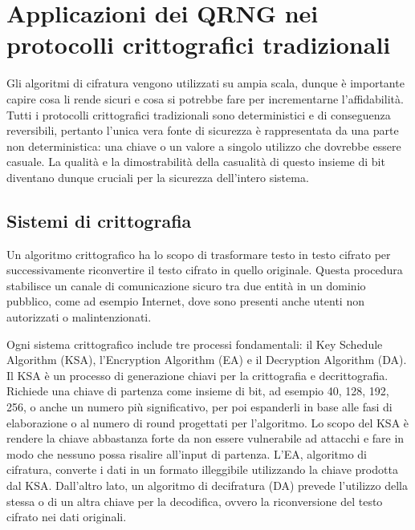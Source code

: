 \chapter{Applicazioni dei QRNG nei protocolli crittografici tradizionali}

Gli algoritmi di cifratura vengono utilizzati su ampia scala, dunque è importante capire cosa li rende sicuri e cosa si potrebbe fare per incrementarne l'affidabilità. Tutti i protocolli crittografici tradizionali sono deterministici e di conseguenza reversibili, pertanto l'unica vera fonte di sicurezza è rappresentata da una parte non deterministica: una chiave o un valore a singolo utilizzo che dovrebbe essere casuale. La qualità e la dimostrabilità della casualità di questo insieme di bit diventano dunque cruciali per la sicurezza dell'intero sistema. 

\section{Sistemi di crittografia}
Un algoritmo crittografico ha lo scopo di trasformare testo in testo cifrato per successivamente riconvertire il testo cifrato in quello originale. Questa procedura stabilisce un canale di comunicazione sicuro tra due entità in un dominio pubblico, come ad esempio Internet, dove sono presenti anche utenti non autorizzati o malintenzionati. 

Ogni sistema crittografico include tre processi fondamentali: il Key Schedule Algorithm (KSA), l'Encryption Algorithm (EA) e il Decryption Algorithm (DA). Il KSA è un processo di generazione chiavi per la crittografia e decrittografia. Richiede una chiave di partenza come insieme di bit, ad esempio 40, 128, 192, 256, o anche un numero più significativo, per poi espanderli in base alle fasi di elaborazione o al numero di round progettati per l'algoritmo. Lo scopo del KSA è rendere la chiave abbastanza forte da non essere vulnerabile ad attacchi e fare in modo che nessuno possa risalire all'input di partenza. L'EA, algoritmo di cifratura, converte i dati in un formato illeggibile utilizzando la chiave prodotta dal KSA. Dall'altro lato, un algoritmo di decifratura (DA) prevede l'utilizzo della stessa o di un altra chiave per la decodifica, ovvero la riconversione del testo cifrato nei dati originali. 

